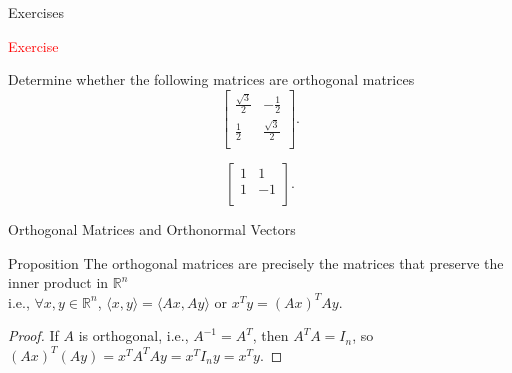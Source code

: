 \documentclass[aspectratio=169, UTF8]{ctexbeamer}
\begin{document}
\begin{frame}{Exercises}

    \par \textcolor{red}{Exercise}
    \par Determine whether the following matrices are orthogonal matrices
    \begin{equation*}
        \left[ \begin{array}{cc}
                \frac{\sqrt{3}}{2} & -\frac{1}{2}       \\
                \frac{1}{2}        & \frac{\sqrt{3}}{2} \\
            \end{array} \right].
    \end{equation*}

    \begin{equation*}
        \left[ \begin{array}{cc}
                1 & 1  \\
                1 & -1 \\
            \end{array} \right].
    \end{equation*}
\end{frame}
\begin{frame}{Orthogonal Matrices and Orthonormal Vectors}
    \begin{block}{Proposition}
        The orthogonal matrices are precisely the matrices that preserve the inner product in $\mathbb{R}^n$ \\
        i.e., $\forall x,y \in \mathbb{R}^n$, $\langle x,y \rangle = \langle Ax, Ay \rangle$
        or $x^T y = (Ax)^T Ay$.
    \end{block}



    \begin{proof}
        If $A$ is orthogonal, i.e., $A^{-1} = A^T$,
        then $A^T A = I_n$, so $(Ax)^T (Ay) = x^T A^T A y = x^T I_n y = x^T y$.
    \end{proof}
\end{frame}
\end{document}
